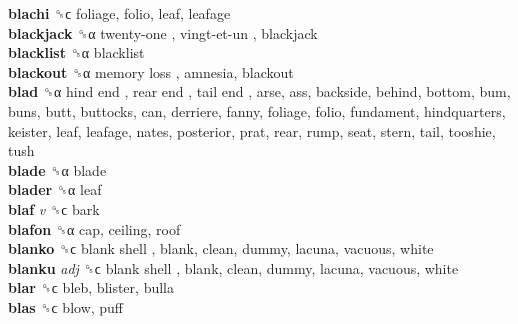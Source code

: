 \textbf{blachi} ␝ϲ  foliage, folio, leaf, leafage  \\
\textbf{blackjack} ␝α   twenty-one ,  vingt-et-un , blackjack  \\
\textbf{blacklist} ␝α  blacklist  \\
\textbf{blackout} ␝α   memory loss , amnesia, blackout  \\
\textbf{blad} ␝α   hind end ,  rear end ,  tail end , arse, ass, backside, behind, bottom, bum, buns, butt, buttocks, can, derriere, fanny, foliage, folio, fundament, hindquarters, keister, leaf, leafage, nates, posterior, prat, rear, rump, seat, stern, tail, tooshie, tush  \\
\textbf{blade} ␝α  blade  \\
\textbf{blader} ␝α  leaf  \\
\textbf{blaf} \emph{v}  ␝ϲ  bark  \\
\textbf{blafon} ␝α  cap, ceiling, roof  \\
\textbf{blanko} ␝ϲ   blank shell , blank, clean, dummy, lacuna, vacuous, white  \\
\textbf{blanku} \emph{adj}  ␝ϲ   blank shell , blank, clean, dummy, lacuna, vacuous, white  \\
\textbf{blar} ␝ϲ  bleb, blister, bulla  \\
\textbf{blas} ␝ϲ  blow, puff  \\
